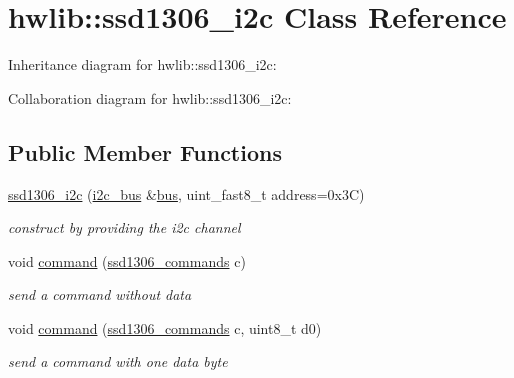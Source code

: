 \hypertarget{classhwlib_1_1ssd1306__i2c}{}\section{hwlib\+:\+:ssd1306\+\_\+i2c Class Reference}
\label{classhwlib_1_1ssd1306__i2c}


Inheritance diagram for hwlib\+:\+:ssd1306\+\_\+i2c\+:


Collaboration diagram for hwlib\+:\+:ssd1306\+\_\+i2c\+:
\subsection*{Public Member Functions}
\begin{DoxyCompactItemize}
\item 
\mbox{\label{classhwlib_1_1ssd1306__i2c_a774c16248b7450b141ed11ccba10c85f}} 
\hyperlink{classhwlib_1_1ssd1306__i2c_a774c16248b7450b141ed11ccba10c85f}{ssd1306\+\_\+i2c} (\hyperlink{classhwlib_1_1i2c__bus}{i2c\+\_\+bus} \&\hyperlink{classhwlib_1_1ssd1306__i2c_a6dd727643c4b270cc364cd6e00ec84e9}{bus}, uint\+\_\+fast8\+\_\+t address=0x3\+C)
\begin{DoxyCompactList}\small\item\em construct by providing the i2c channel \end{DoxyCompactList}\item 
\mbox{\label{classhwlib_1_1ssd1306__i2c_a2c27f988f3850cf6524a4731a81fc654}} 
void \hyperlink{classhwlib_1_1ssd1306__i2c_a2c27f988f3850cf6524a4731a81fc654}{command} (\hyperlink{namespacehwlib_a9dcd26ad4dc21c1a72b57fb76f65e811}{ssd1306\+\_\+commands} c)
\begin{DoxyCompactList}\small\item\em send a command without data \end{DoxyCompactList}\item 
\mbox{\label{classhwlib_1_1ssd1306__i2c_a006d72bfb812ed7f11b662cc2d3503e3}} 
void \hyperlink{classhwlib_1_1ssd1306__i2c_a006d72bfb812ed7f11b662cc2d3503e3}{command} (\hyperlink{namespacehwlib_a9dcd26ad4dc21c1a72b57fb76f65e811}{ssd1306\+\_\+commands} c, uint8\+\_\+t d0)
\begin{DoxyCompactList}\small\item\em send a command with one data byte \end{DoxyCompactList}\item 

\end{DoxyCompactItemize}
